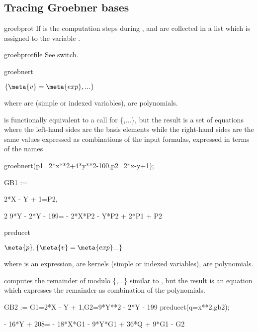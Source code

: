 \subsection{Tracing Groebner bases}
\begin{Switch}{groebprot}
If  is  the computation steps during
,  and 
are collected in a list which is assigned to the variable
.
\end{Switch}
\begin{Variable}{groebprotfile}
See  switch.
\end{Variable}

\begin{Operator}{groebnert}
\begin{Syntax}

  \(\{\meta{v}=\meta{exp},...\}\)

\end{Syntax}
where  are  (simple or indexed variables),
 are polynomials.


 is functionally equivalent to a 
call for \{,...\}, but the result is a set of
equations where the left-hand sides are the basis elements while
the right-hand sides are the same values expressed as combinations
of the input formulas, expressed in terms of the names 
\begin{Bigexample}
    groebnert({p1=2*x**2+4*y**2-100,p2=2*x-y+1});

   GB1 := {2*X - Y + 1=P2,

           2
        9*Y  - 2*Y - 199= - 2*X*P2 - Y*P2 + 2*P1 + P2}
\end{Bigexample}
\end{Operator}

\begin{Operator}{preducet}
\begin{Syntax}

\(\meta{p},\{\meta{v}=\meta{exp}...\}\)
\end{Syntax}
where  is an expression,  are kernels 
(simple or indexed variables),
 are polynomials.

 computes the remainder of  modulo \{,...\}
similar to , but the result is an equation
which expresses the remainder as combination of the polynomials.
\begin{Bigexample}
                             
   GB2 := {G1=2*X - Y + 1,G2=9*Y**2  - 2*Y - 199}
   preducet(q=x**2,gb2);

 - 16*Y + 208= - 18*X*G1 - 9*Y*G1 + 36*Q + 9*G1 - G2
\end{Bigexample}
\end{Operator}

